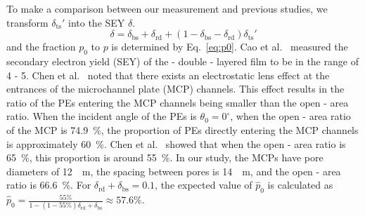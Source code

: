 To make a comparison between our measurement and previous studies, we transform \(\delta_\text{ts}'\) into the SEY \(\delta\).
\begin{equation}
	\label{eq:2}
	\delta = \delta_\text{bs} + \delta_\text{rd} + (1-\delta_\text{bs} - \delta_\text{rd}) \delta_\text{ts}'
\end{equation}
and the fraction \(p_0\) to \(p\) is determined by Eq.~\eqref{eq:p0}. Cao et al.~\cite{cao_secondary_2021} measured the secondary electron yield (SEY) of the - double - layered film to be in the range of 4 - 5. Chen et al.~\cite{2016Optimization} noted that there exists an electrostatic lens effect at the entrances of the microchannel plate (MCP) channels. This effect results in the ratio of the PEs entering the MCP channels being smaller than the open - area ratio. When the incident angle of the PEs is \(\theta_0 = 0^\circ\), when the open - area ratio of the MCP is \SI{74.9}{\percent}, the proportion of PEs directly entering the MCP channels is approximately \SI{60}{\percent}. Chen et al.~\cite{chen2018photoelectron} showed that when the open - area ratio is \SI{65}{\percent}, this proportion is around \SI{55}{\percent}. In our study, the MCPs have pore diameters of \SI{12}{\mu\meter}, the spacing between pores is \SI{14} {\mu\meter}, and the open - area ratio is \SI{66.6}{\percent}. For \(\delta_{\mathrm{rd}}+\delta_{\mathrm{bs}} = 0.1\), the expected value of \(\hat{p}_0\) is calculated as \(\hat{p}_0=\frac{55\%}{1-(1 - 55\%)\delta_{\mathrm{rd}}+\delta_{\mathrm{bs}}}\approx 57.6\%\).
